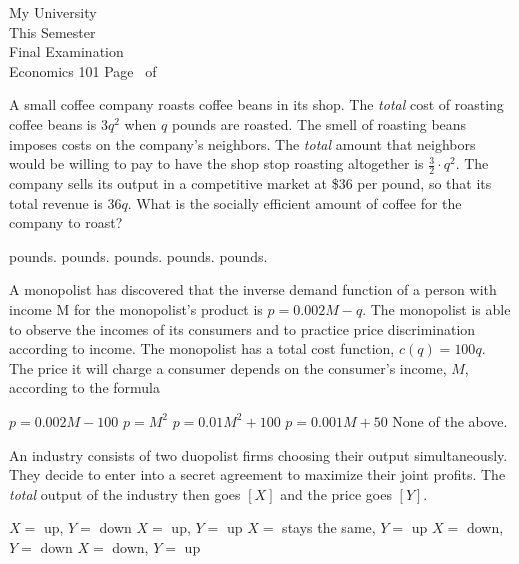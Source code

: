 \documentclass[12pt,addpoints]{exam}
\begin{document}
\pagestyle{headandfoot} \extraheadheight{.25in} 
\firstpageheader{} {My University\\ This Semester \\ Final Examination \\ Economics 101} {} 
\footer{} {Page \thepage\ of \numpages} {}



\begin{questions}


\myquestion[5] A small coffee company roasts coffee beans in its shop. 
The {\em total} cost of roasting coffee beans is $3q^2$ when
$q$ pounds are roasted. 
The smell of roasting beans imposes costs on the 
company's neighbors. The {\em total} amount that neighbors 
would be willing to pay to have the shop stop roasting 
altogether is $\frac{3}{2} \cdot q^2$. The company sells its output in a 
competitive market at \$36 per pound, so that its total revenue is $36q$. What is the 
socially efficient amount of coffee for the company to 
roast? 
	\begin{choices}
	 pounds. 
	 pounds.
	 pounds.
	 pounds.
	 pounds.
	\end{choices}

\myquestion[5] A monopolist has discovered that the inverse demand function of a
person with income M for the monopolist’s product is $p = 0.002M - q$. The
monopolist is able to observe the incomes of its consumers and to practice price
discrimination according to income.
 The monopolist has a total cost function, $c(q) = 100q$. The
price it will charge a consumer depends on the consumer's income, $M$, according
to the formula
	\begin{choices}
	\choice $p = 0.002M - 100$
	\choice $p = M^2$
	\choice $p = 0.01 M^2 + 100$
	\CorrectChoice $p = 0.001M + 50$
	\choice None of the above.
	\end{choices}

\myquestion[5] An industry consists of two duopolist firms choosing their output
simultaneously.  They decide to enter into a secret agreement to maximize their
joint profits.  The {\em total} output of the industry then goes $[X]$ and the
price goes $[Y]$.
	\begin{choices}
	\choice $X =$ up, $Y =$ down
	\choice $X =$ up, $Y =$ up
	\choice $X =$ stays the same, $Y =$ up
	\choice $X =$ down, $Y =$ down
	\CorrectChoice $X =$ down, $Y =$ up
	\end{choices}


\end{questions}
\end{document}
